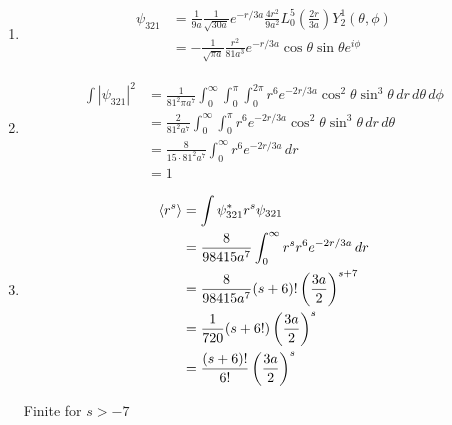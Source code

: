 \documentclass{article}
\begin{document}
\setcounter{subsection}{51}
\subsection{}

\begin{enumerate}
  \item

        \begin{align*}
          \psi_{3 2 1} & = \frac{1}{9 a} \frac{1}{\sqrt{30 a}} e^{-r / 3 a} \frac{4 r^2}{9 a^2} L_0^5 \left( \frac{2 r}{3 a} \right) Y_2^1 (\theta, \phi) \\
                       & = -\frac{1}{\sqrt{\pi a}} \frac{r^2}{81 a^3} e^{-r / 3 a} \cos \theta \sin \theta e^{i \phi}
        \end{align*}

  \item

        \begin{align*}
          \int |\psi_{3 2 1}|^2 & = \frac{1}{81^2 \pi a^7} \int_0^\infty \int_0^\pi \int_0^{2 \pi} r^6 e^{-2 r / 3 a} \cos^2 \theta \sin^3 \theta \,d r \,d \theta \,d \phi \\
                                & = \frac{2}{81^2 a^7} \int_0^\infty \int_0^\pi r^6 e^{-2 r / 3 a} \cos^2 \theta \sin^3 \theta \,d r \,d \theta                             \\
                                & = \frac{8}{15 \cdot 81^2 a^7} \int_0^\infty r^6 e^{-2 r / 3 a} \,d r                                                                      \\
                                & = 1
        \end{align*}

  \item

        \begin{align*}
          \braket{r^s} & = \int \psi_{3 2 1}^* r^s \psi_{3 2 1}                              \\
                       & = \frac{8}{98415 a^7} \int_0^\infty r^s r^6 e^{-2 r / 3 a} \,d r    \\
                       & = \frac{8}{98415 a^7} (s + 6)! \left( \frac{3 a}{2} \right)^{s + 7} \\
                       & = \frac{1}{720} (s + 6!) \left( \frac{3 a}{2} \right)^s             \\
                       & = \frac{(s + 6)!}{6!} \left( \frac{3 a}{2} \right)^s
        \end{align*}

        Finite for $s > -7$
\end{enumerate}
\end{document}
